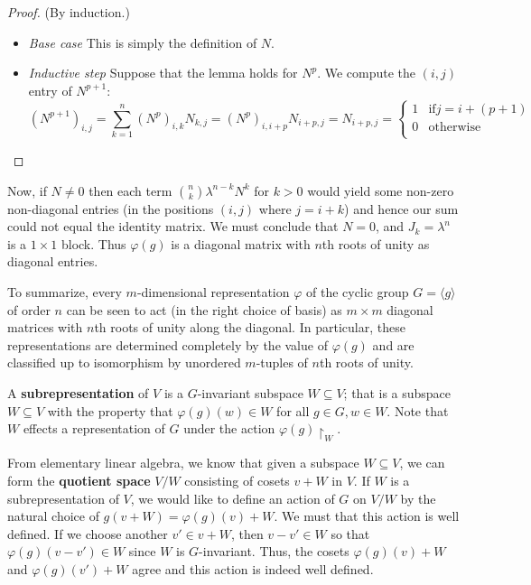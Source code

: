 \begin{example}
\begin{lemma}
\begin{proof}
(By induction.)
\begin{itemize}
\item \textit{Base case} This is simply the definition of $N$.
\item \textit{Inductive step} Suppose that the lemma holds for $N^p$.  We compute the $(i,j)$ entry of $N^{p+1}$:
\[ (N^{p+1})_{i,j} = \sum_{k=1}^{n} (N^{p})_{i,k} N_{k, j} = (N^p)_{i, i +p} N_{i +p, j} = N_{i +p, j} =\begin{cases} 
      1 & \text{if}  j = i + (p +1) \\
      0 & \text{otherwise} \\
   \end{cases}  \]
\end{itemize}
\end{proof}
\end{lemma}

Now, if $N \neq 0$ then each term $\binom {n}{k} \lambda ^ {n - k } N ^k$ for $k > 0$ would yield some non-zero non-diagonal entries (in the positions $(i,j)$ where $j= i + k$) and hence our sum could not equal the identity matrix.  We must conclude that $N = 0$, and $J_k = \lambda ^n$ is a $1 \times 1$ block.  Thus $\varphi(g)$ is a diagonal matrix with $n$th roots of unity as diagonal entries. 

To summarize, every $m$-dimensional representation $\varphi$ of the cyclic group $G = \langle g \rangle$ of order $n$ can be seen to act (in the right choice of basis) as $m \times m$ diagonal matrices with $n$th roots of unity along the diagonal.  In particular, these representations are determined completely by the value of $\varphi(g)$ and are classified up to isomorphism by unordered $m$-tuples of $n$th roots of unity.
\end{example}


\begin{defn} A \textbf{subrepresentation} of $V$ is a $G$-invariant subspace $W \subseteq V$; that is a subspace $W \subseteq V$ with the property that $\varphi(g) (w) \in W$ for all $g \in G, w \in W$.  Note that $W$ effects a representation of $G$ under the action $\varphi(g) \restriction_W$.
\end{defn}

From elementary linear algebra, we know that given a subspace $W \subseteq V$, we can form the \textbf{quotient space} $V / W$ consisting of cosets $v + W$ in $V$.  If $W$ is a subrepresentation of $V$, we would like to define an action of $G$ on $V / W$ by the natural choice of $g (v + W) = \varphi(g)(v)+ W$.  We must that this action is well defined.  If we choose another $v' \in v + W$, then $v - v' \in W$ so that $\varphi(g)(v - v') \in W$ since $W$ is $G$-invariant.  Thus, the cosets $\varphi(g)(v) + W$ and $\varphi(g)(v') + W$ agree and this action is indeed well defined.


